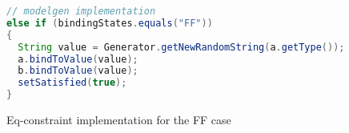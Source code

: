 \begin{figure}[htbp]
\begin{center}
\begin{lstlisting}[language=Java,backgroundcolor=\color{white}, keywordstyle={\bfseries\color{purple}}]
// modelgen implementation
else if (bindingStates.equals("FF"))
{
  String value = Generator.getNewRandomString(a.getType());
  a.bindToValue(value);
  b.bindToValue(value);
  setSatisfied(true);
}
\end{lstlisting}
  \caption{Eq-constraint implementation for the FF case}
  \label{eclipse:modelgen_eq_implementation}
\end{center}
\end{figure}

 